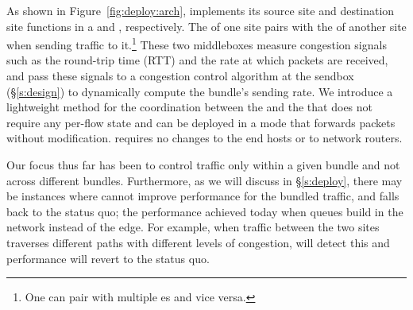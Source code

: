 \fi








As shown in Figure~\ref{fig:deploy:arch}, \name implements its source site and destination site functions in a \emph{\inbox} and \emph{\outbox}, respectively. The \inbox of one site pairs with the \outbox of another site when sending traffic to it.\footnote{One \inbox can pair with multiple {\outbox}es and vice versa.} 
These two middleboxes measure congestion signals such as the round-trip time (RTT) and the rate at which packets are received, and pass these signals to a congestion control algorithm at the sendbox (\S\ref{s:design}) to dynamically compute the bundle's sending rate.
We introduce a lightweight method for the coordination between the \inbox and the \outbox that does not require any per-flow state and can be deployed in a mode that forwards packets without modification.  \name requires no changes to the end hosts or to network routers.
 
Our focus thus far has been to control traffic only within a given bundle and not across different bundles. 
Furthermore, as we will discuss in \S\ref{s:deploy}, there may be instances where \name cannot improve performance for the bundled traffic, and falls back to the status quo; \ie the performance achieved today when queues build in the network instead of the edge. For example, when traffic between the two sites traverses different paths with different levels of congestion, \name will detect this and performance will revert to the status quo.
 
